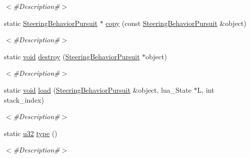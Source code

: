 \begin{DoxyCompactItemize}
\begin{DoxyCompactList}\small\item\em $<$\#\+Description\#$>$ \end{DoxyCompactList}\item 
static \mbox{\hyperlink{classnjli_1_1_steering_behavior_pursuit}{Steering\+Behavior\+Pursuit}} $\ast$ \mbox{\hyperlink{classnjli_1_1_steering_behavior_pursuit_a14a800efdbe7cbad41db3d56d0a1b22e}{copy}} (const \mbox{\hyperlink{classnjli_1_1_steering_behavior_pursuit}{Steering\+Behavior\+Pursuit}} \&object)
\begin{DoxyCompactList}\small\item\em $<$\#\+Description\#$>$ \end{DoxyCompactList}\item 
static \mbox{\hyperlink{_thread_8h_af1e856da2e658414cb2456cb6f7ebc66}{void}} \mbox{\hyperlink{classnjli_1_1_steering_behavior_pursuit_a4c966886f73de91d80ec621875c27ad0}{destroy}} (\mbox{\hyperlink{classnjli_1_1_steering_behavior_pursuit}{Steering\+Behavior\+Pursuit}} $\ast$object)
\begin{DoxyCompactList}\small\item\em $<$\#\+Description\#$>$ \end{DoxyCompactList}\item 
static \mbox{\hyperlink{_thread_8h_af1e856da2e658414cb2456cb6f7ebc66}{void}} \mbox{\hyperlink{classnjli_1_1_steering_behavior_pursuit_a6ca9631b6899e6b51e58d943535650cd}{load}} (\mbox{\hyperlink{classnjli_1_1_steering_behavior_pursuit}{Steering\+Behavior\+Pursuit}} \&object, lua\+\_\+\+State $\ast$L, int stack\+\_\+index)
\begin{DoxyCompactList}\small\item\em $<$\#\+Description\#$>$ \end{DoxyCompactList}\item 
static \mbox{\hyperlink{_util_8h_a10e94b422ef0c20dcdec20d31a1f5049}{u32}} \mbox{\hyperlink{classnjli_1_1_steering_behavior_pursuit_a82fda2fba164704e2c00b11cd7692751}{type}} ()
\begin{DoxyCompactList}\small\item\em $<$\#\+Description\#$>$ \end{DoxyCompactList}\end{DoxyCompactItemize}
